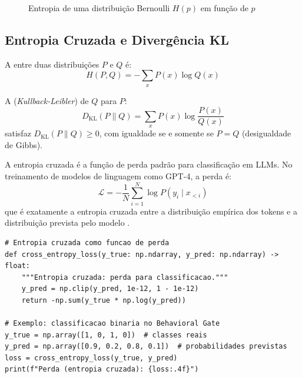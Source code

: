 \begin{figure}[htb]
    \centering
    \caption{Entropia de uma distribuição Bernoulli $H(p)$ em função de $p$}
    \label{fig:entropia-bernoulli}
\end{figure}

\subsection{Entropia Cruzada e Divergência KL}

\begin{definicao}
    A  entre duas distribuições $P$ e $Q$ é:
    \[
    H(P, Q) = -\sum_{x} P(x) \log Q(x)
    \]
\end{definicao}

\begin{definicao}[Divergência KL]
    A  (\textit{Kullback-Leibler}) de $Q$ para $P$:
    \[
    D_{\text{KL}}(P \parallel Q) = \sum_{x} P(x) \log \frac{P(x)}{Q(x)}
    \]
    satisfaz $D_{\text{KL}}(P \parallel Q) \geq 0$, com igualdade se e
    somente se $P = Q$ (desigualdade de Gibbs).
\end{definicao}

\begin{exemplo}
    A entropia cruzada é a função de perda padrão para classificação em
    LLMs. No treinamento de modelos de linguagem como GPT-4, a perda é:
    \[
    \mathcal{L} = -\frac{1}{N} \sum_{i=1}^{N} \log P(y_i \mid x_{<i})
    \]
    que é exatamente a entropia cruzada entre a distribuição empírica dos
    tokens e a distribuição prevista pelo modelo \cite{brown2020language,
    achiam2023gpt4}.
\end{exemplo}

\begin{lstlisting}[style=pythonstyle]
# Entropia cruzada como funcao de perda
def cross_entropy_loss(y_true: np.ndarray, y_pred: np.ndarray) -> float:
    """Entropia cruzada: perda para classificacao."""
    y_pred = np.clip(y_pred, 1e-12, 1 - 1e-12)
    return -np.sum(y_true * np.log(y_pred))

# Exemplo: classificacao binaria no Behavioral Gate
y_true = np.array([1, 0, 1, 0])  # classes reais
y_pred = np.array([0.9, 0.2, 0.8, 0.1])  # probabilidades previstas
loss = cross_entropy_loss(y_true, y_pred)
print(f"Perda (entropia cruzada): {loss:.4f}")
\end{lstlisting}

